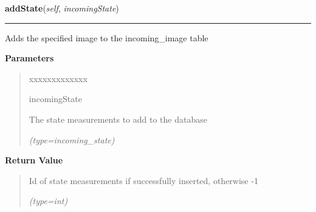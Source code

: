 \hspace{.8\funcindent}\begin{boxedminipage}{\funcwidth}

    \raggedright \textbf{addState}(\textit{self}, \textit{incomingState})

    \vspace{-1.5ex}

    \rule{\textwidth}{0.5\fboxrule}
\setlength{\parskip}{2ex}
    Adds the specified image to the incoming\_image table

\setlength{\parskip}{1ex}
      \textbf{Parameters}
      \vspace{-1ex}

      \begin{quote}
        \begin{Ventry}{xxxxxxxxxxxxx}

          \item[incomingState]

          The state measurements to add to the database

            {\it (type=incoming\_state)}

        \end{Ventry}

      \end{quote}

      \textbf{Return Value}
    \vspace{-1ex}

      \begin{quote}
      Id of state measurements if successfully inserted, otherwise -1

      {\it (type=int)}

      \end{quote}

    \end{boxedminipage}

    \label{src:dao:incoming_state_dao:IncomingStateDAO:getStateById}

    \vspace{0.5ex}

